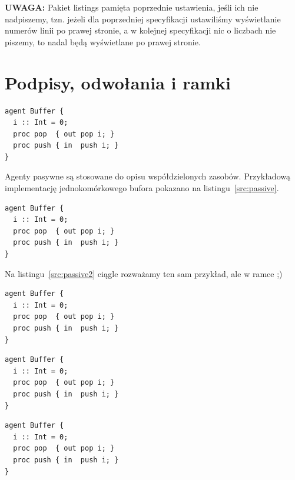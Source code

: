 \documentclass[a4paper,11pt]{article}
\begin{document}
\textbf{UWAGA:} Pakiet listings pamięta poprzednie ustawienia, jeśli ich nie nadpiszemy, tzn. jeżeli dla poprzedniej specyfikacji ustawiliśmy wyświetlanie numerów linii po prawej stronie, a w kolejnej specyfikacji nic o liczbach nie piszemy, to nadal będą wyświetlane po prawej stronie.

\newpage

\section{Podpisy, odwołania i ramki}

\begin{lstlisting}[caption=Przykład agenta pasywnego,
captionpos=b, label=src:passive]
agent Buffer {
  i :: Int = 0;
  proc pop  { out pop i; }
  proc push { in  push i; }
}
\end{lstlisting}

Agenty pasywne są stosowane do opisu współdzielonych zasobów. Przykładową implementację jednokomórkowego bufora pokazano na listingu~\ref{src:passive}. 


\begin{lstlisting}[caption=Przykład agenta pasywnego, captionpos=b,
label=src:passive2, firstnumber=12,frame=single]
agent Buffer {
  i :: Int = 0;
  proc pop  { out pop i; }
  proc push { in  push i; }
}
\end{lstlisting}

Na listingu~\ref{src:passive2} ciągle rozważamy ten sam przykład, ale w ramce ;)


\begin{lstlisting}[caption=Przykład agenta pasywnego, captionpos=t,
label=src:passive3, frame=tbLR]
agent Buffer {
  i :: Int = 0;
  proc pop  { out pop i; }
  proc push { in  push i; }
}
\end{lstlisting}


\begin{lstlisting}[caption=Przykład agenta pasywnego, captionpos=t,
label=src:passive4, frame=TB]
agent Buffer {
  i :: Int = 0;
  proc pop  { out pop i; }
  proc push { in  push i; }
}
\end{lstlisting}



\begin{lstlisting}[caption=Przykład agenta pasywnego, captionpos=t,
label=src:passive5, frame=LBtr, frameround=tftf]
agent Buffer {
  i :: Int = 0;
  proc pop  { out pop i; }
  proc push { in  push i; }
}
\end{lstlisting}
\end{document}

